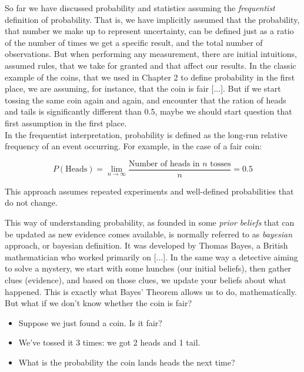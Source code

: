 \documentclass{book}
\begin{document}
So far we have discussed probability and statistics assuming the \textit{frequentist} definition of probability. That is, we have implicitly assumed that the probability, that number we make up to represent uncertainty, can be defined just as a ratio of the number of times we get a specific result, and the total number of observations. But when performing any measurement, there are initial intuitions, assumed rules, that we take for granted and that affect our results. In the classic example of the coins, that we used in Chapter 2 to define probability in the first place, we are assuming, for instance, that the coin is fair [...]. But if we start tossing the same coin again and again, and encounter that the ration of heads and tails is significantly different than 0.5, maybe we should start question that first assumption in the first place.\\

In the frequentist interpretation, probability is defined as the long-run relative frequency of an event occurring. For example, in the case of a fair coin:

\[
P(\text{Heads}) = \lim_{n \to \infty} \frac{\text{Number of heads in } n \text{ tosses}}{n} = 0.5
\]

This approach assumes repeated experiments and well-defined probabilities that do not change.

This way of understanding probability, as founded in some \textit{prior beliefs} that can be updated as new evidence comes available, is normally referred to as \textit{bayesian} approach, or bayesian definition. It was developed by Thomas Bayes, a British mathematician who worked primarily on [...]. In the same way a detective aiming to solve a mystery, we start with some hunches (our initial beliefs), then gather clues (evidence), and based on those clues, we update your beliefs about what happened. This is exactly what Bayes' Theorem allows us to do, mathematically.\\


But what if we don't know whether the coin is fair?

\begin{itemize}
    \item Suppose we just found a coin. Is it fair?
    \item We've tossed it 3 times: we got 2 heads and 1 tail.
    \item What is the probability the coin lands heads the next time?
\end{itemize}
\end{document}
